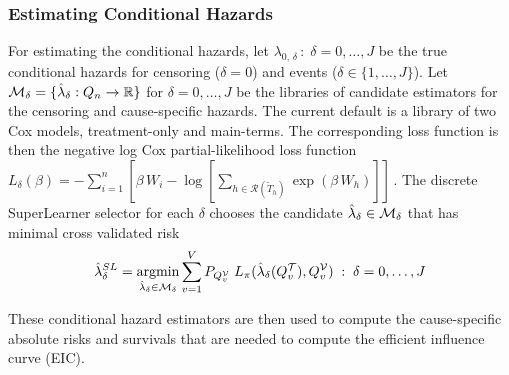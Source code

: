 \documentclass{report}
\DeclareMathOperator*{\argmin}{argmin}
\newcommand{\1}{\ensuremath{\mathbf{1}}}
\newcommand{\T}{\ensuremath{\widetilde{T}}}
\newcommand{\g}{\ensuremath{\pi}}
\renewcommand{\L}{\ensuremath{W}}
\begin{document}
\subsubsection{Estimating Conditional Hazards}
\label{haz-est}
For estimating the conditional hazards, let \(\lambda_{0,\,\delta} \,:\; \delta = 0, \dots, J\) be the true conditional hazards for censoring (\(\delta = 0\)) and events (\(\delta \in \{1, \dots, J\}\)). Let \(\mathcal{M}_\delta = \{\Hat{\lambda}_\delta : Q_n \to \mathbb{R}\}\) for \(\delta = 0, \dots, J\) be the libraries of candidate estimators for the censoring and cause-specific hazards. The current  default is a library of two Cox models, treatment-only and main-terms. The corresponding loss function is then the negative log Cox partial-likelihood loss function \(L_\delta(\beta) = - \sum_{i=1}^{n} \left[\beta\,\L_i - \log\left[\sum_{h \in \mathcal{R}(\T_h)} \exp(\beta\,\L_h)\right]\right] \,\). The discrete SuperLearner selector for each \(\delta\) chooses the candidate \(\Hat{\lambda}_\delta \in \mathcal{M}_\delta\) that has minimal cross validated risk 
\begin{equation}
\Hat{\lambda}_\delta^{SL} = \argmin_{\Hat{\lambda}_\delta \in \mathcal{M}_\delta} \sum_{v = 1}^{V} P_{Q^\mathcal{V}_v} \; L_\g(\Hat{\lambda}_\delta(Q^\mathcal{T}_v), Q^\mathcal{V}_v) \;:\; \delta = 0, \dots, J\label{hazsl}
\end{equation}

These conditional hazard estimators are then used to compute the cause-specific absolute risks and survivals that are needed to compute the efficient influence curve (EIC). 
\end{document}
